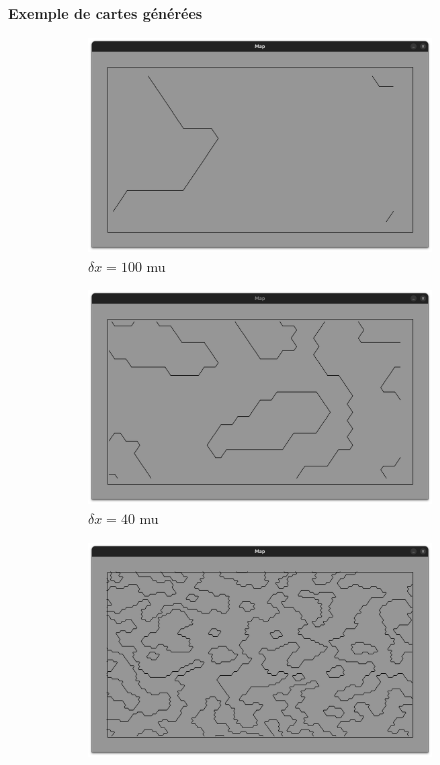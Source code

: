 \documentclass[aspectratio=169,10pt]{beamer}
\begin{document}
\begin{frame}{\textbf{Exemple de cartes générées}}
    \begin{figure}[H]
		\centering
		\begin{subfigure}{0.32\textwidth}
			\centering
			\includegraphics[width=\textwidth]{IMAGES/map_dx100.png}
			\caption{$\delta x = 100$ mu}
			\label{fig:real_map_100}
		\end{subfigure}
		\hfill
		\begin{subfigure}{0.32\textwidth}
			\centering
			\includegraphics[width=\textwidth]{IMAGES/map_dx40.png}
			\caption{$\delta x = 40$ mu}
			\label{fig:real_map_40}
		\end{subfigure}
		\hfill
		\begin{subfigure}{0.32\textwidth}
			\centering
			\includegraphics[width=\textwidth]{IMAGES/map_dx10.png}

\end{subfigure}
\end{figure}
\end{frame}
\end{document}
